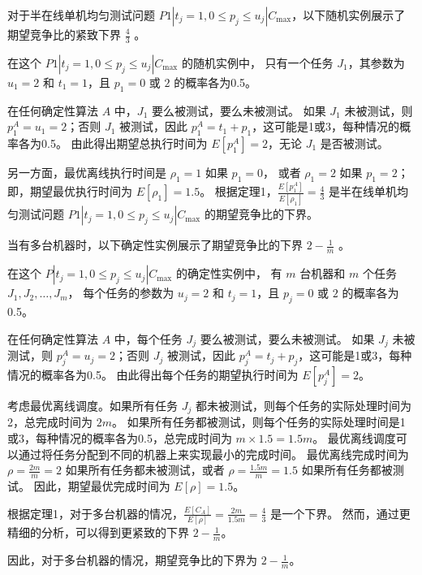 对于半在线单机均匀测试问题 \( P1 | t_j = 1, 0 \leq p_j \leq u_j | C_{\max} \)，以下随机实例展示了期望竞争比的紧致下界 \(\frac{4}{3}\)
\cite{durr2018scheduling}\cite{durr2020adversarial}\cite{albers2021explorable}。

\begin{exm}
    在这个 \( P1 | t_j = 1, 0 \leq p_j \leq u_j | C_{\max} \) 的随机实例中，
    只有一个任务 \( J_1 \)，其参数为 \( u_1 = 2 \) 和 \( t_1 = 1 \)，且 \( p_1 = 0 \) 或 \( 2 \) 的概率各为0.5。

    在任何确定性算法 \( A \) 中，\( J_1 \) 要么被测试，要么未被测试。
    如果 \( J_1 \) 未被测试，则 \( p^A_1 = u_1 = 2 \)；否则 \( J_1 \) 被测试，因此 \( p^A_1 = t_1 + p_1 \)，这可能是1或3，每种情况的概率各为0.5。
    由此得出期望总执行时间为 \( E[p^A_1] = 2 \)，无论 \( J_1 \) 是否被测试。
    
    另一方面，最优离线执行时间是 \( \rho_1 = 1 \) 如果 \( p_1 = 0 \)，
    或者 \( \rho_1 = 2 \) 如果 \( p_1 = 2 \)；即，期望最优执行时间为 \( E[\rho_1] = 1.5 \)。
    根据定理1，\( \frac{E[p^A_1]}{E[\rho_1]} = \frac{4}{3} \) 是半在线单机均匀测试问题 \( P1 | t_j = 1, 0 \leq p_j \leq u_j | C_{\max} \) 的期望竞争比的下界。    
\end{exm}

当有多台机器时，以下确定性实例展示了期望竞争比的下界 \( 2 - \frac{1}{m} \) \cite{albers2021scheduling}。

\begin{exm}
    在这个 \( P | t_j = 1, 0 \leq p_j \leq u_j | C_{\max} \) 的确定性实例中，
    有 \( m \) 台机器和 \( m \) 个任务 \( J_1, J_2, \ldots, J_m \)，
    每个任务的参数为 \( u_j = 2 \) 和 \( t_j = 1 \)，且 \( p_j = 0 \) 或 \( 2 \) 的概率各为0.5。

    在任何确定性算法 \( A \) 中，每个任务 \( J_j \) 要么被测试，要么未被测试。
    如果 \( J_j \) 未被测试，则 \( p^A_j = u_j = 2 \)；否则 \( J_j \) 被测试，因此 \( p^A_j = t_j + p_j \)，这可能是1或3，每种情况的概率各为0.5。
    由此得出每个任务的期望执行时间为 \( E[p^A_j] = 2 \)。
    
    考虑最优离线调度。如果所有任务 \( J_j \) 都未被测试，则每个任务的实际处理时间为2，总完成时间为 \( 2m \)。
    如果所有任务都被测试，则每个任务的实际处理时间是1或3，每种情况的概率各为0.5，总完成时间为 \( m \times 1.5 = 1.5m \)。
    最优离线调度可以通过将任务分配到不同的机器上来实现最小的完成时间。
    最优离线完成时间为 \( \rho = \frac{2m}{m} = 2 \) 如果所有任务都未被测试，或者 \( \rho = \frac{1.5m}{m} = 1.5 \) 如果所有任务都被测试。
    因此，期望最优完成时间为 \( E[\rho] = 1.5 \)。
    
    根据定理1，对于多台机器的情况，\( \frac{E[C_A]}{E[\rho]} = \frac{2m}{1.5m} = \frac{4}{3} \) 是一个下界。
    然而，通过更精细的分析，可以得到更紧致的下界 \( 2 - \frac{1}{m} \)。
    
    因此，对于多台机器的情况，期望竞争比的下界为 \( 2 - \frac{1}{m} \)。
\end{exm}

